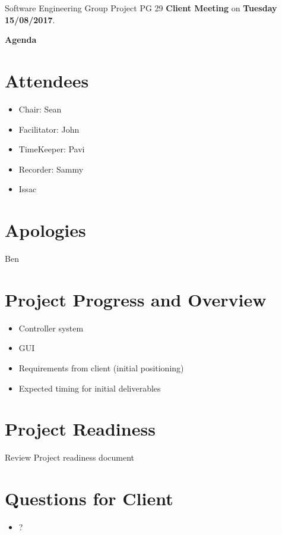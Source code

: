 \documentclass[11pt, a4paper]{article}
\begin{document}
\noindent Software Engineering Group Project PG 29 {\bf Client Meeting} on {\bf Tuesday 15/08/2017}.
\vspace*{10pt}
\begin{center}
\huge \bf Agenda
\end{center}

\section{Attendees}
\begin{itemize}
\item Chair: Sean
\item Facilitator: John
\item TimeKeeper: Pavi
\item Recorder: Sammy
\item Issac
\end{itemize}

\section{Apologies}
\item Ben

\section{Project Progress and Overview}
\begin{itemize}
	\item Controller system 
	\item GUI
	\item Requirements from client (initial positioning)
	\item Expected timing for initial deliverables
\end{itemize}

\section{Project Readiness}
Review Project readiness document

\section{Questions for Client}
\begin{itemize}
	\item ?
\end{itemize}
\end{document}
